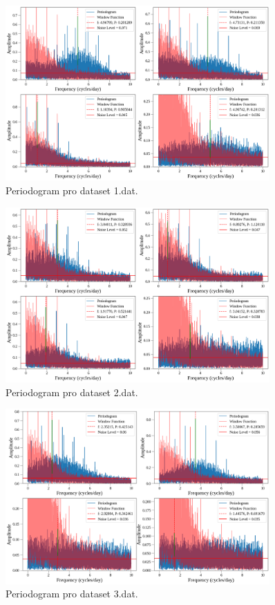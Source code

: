 \documentclass[a4paper,11pt,twocolumn]{article}
\begin{document}
    \begin{figure}
        \centering
        \includegraphics[width=0.9\textwidth]{period/1_per.png}
        \caption{Periodogram pro dataset 1.dat.}
        \label{fig:1_per}
    \end{figure}

    \begin{figure}
        \centering
        \includegraphics[width=0.9\textwidth]{period/2_per.png}
        \caption{Periodogram pro dataset 2.dat.}
        \label{fig:2_per}
    \end{figure}

    \begin{figure}
        \centering
        \includegraphics[width=0.9\textwidth]{period/3_per.png}
        \caption{Periodogram pro dataset 3.dat.}
        \label{fig:3_per}
    \end{figure}
\end{document}

